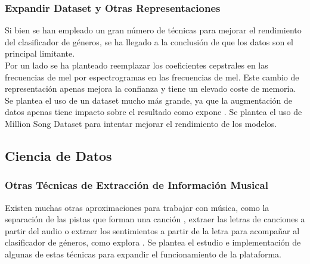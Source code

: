 \subsubsection{Expandir Dataset y Otras Representaciones}
Si bien se han empleado un gran número de técnicas para mejorar el rendimiento del clasificador de géneros, se ha llegado a la conclusión de que los datos son el principal limitante.\\
Por un lado se ha planteado reemplazar los coeficientes cepstrales en las frecuencias de mel por espectrogramas en las frecuencias de mel. Este cambio de representación apenas mejora la confianza y tiene un elevado coste de memoria.\\
Se plantea el uso de un dataset mucho más grande, ya que la augmentación de datos apenas tiene impacto sobre el resultado como expone \cite{augmentation}. Se plantea el uso de Million Song Dataset \cite{million_song_dataset} para intentar mejorar el rendimiento de los modelos. 

\subsection{Ciencia de Datos}


\subsubsection{Otras Técnicas de Extracción de Información Musical}
Existen muchas otras aproximaciones para trabajar con música, como la separación de las pistas que forman una canción \cite{demucs}, extraer las letras de canciones a partir del audio o extraer los sentimientos a partir de la letra para acompañar al clasificador de géneros, como explora \cite{moods_classification}.
Se plantea el estudio e implementación de algunas de estas técnicas para expandir el funcionamiento de la plataforma.